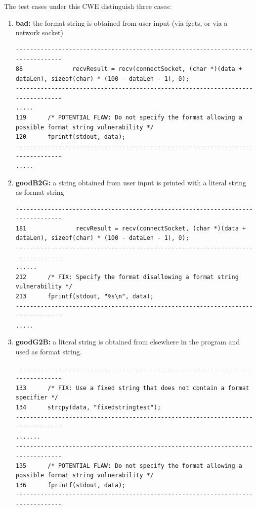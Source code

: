 \documentclass[11pt]{article}
\begin{document}
The test cases under this CWE distinguish three cases:
\begin{enumerate}
\item {\bf bad:} the format string is obtained from user input  (via fgets, or via
a network socket)
\begin{tiny}
\begin{verbatim}
--------------------------------------------------------------------------------
88              recvResult = recv(connectSocket, (char *)(data + dataLen), sizeof(char) * (100 - dataLen - 1), 0);
--------------------------------------------------------------------------------
.....
119      /* POTENTIAL FLAW: Do not specify the format allowing a possible format string vulnerability */
120      fprintf(stdout, data);
--------------------------------------------------------------------------------
.....
\end{verbatim}
\end{tiny}
\item {\bf goodB2G:} a string obtained from user input is printed with a literal
string as format string
\begin{tiny}
\begin{verbatim}
--------------------------------------------------------------------------------
181              recvResult = recv(connectSocket, (char *)(data + dataLen), sizeof(char) * (100 - dataLen - 1), 0);
--------------------------------------------------------------------------------
......
212      /* FIX: Specify the format disallowing a format string vulnerability */
213      fprintf(stdout, "%s\n", data);
--------------------------------------------------------------------------------
.....
\end{verbatim}
\end{tiny}
\item {\bf goodG2B:} a literal string is obtained from elsewhere in the program and
used as format string.
\begin{tiny}
\begin{verbatim}
--------------------------------------------------------------------------------
133      /* FIX: Use a fixed string that does not contain a format specifier */
134      strcpy(data, "fixedstringtest");
--------------------------------------------------------------------------------
.......
--------------------------------------------------------------------------------
135      /* POTENTIAL FLAW: Do not specify the format allowing a possible format string vulnerability */
136      fprintf(stdout, data);
--------------------------------------------------------------------------------
\end{verbatim}
\end{tiny}
\end{enumerate}
\end{document}

